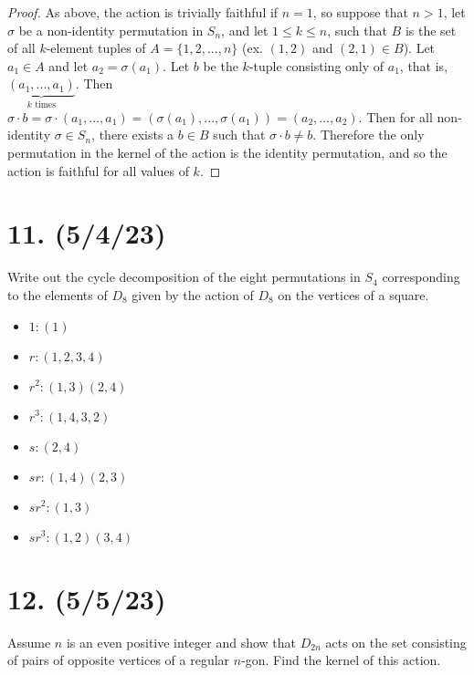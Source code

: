 \documentclass{article}
\begin{document}
\begin{proof}
  As above, the action is trivially faithful if $n = 1$, so suppose that $n > 1$, let $\sigma$ be a non-identity permutation in $S_n$, and let $1 \leq k \leq n$, such that $B$ is the set of all $k$-element tuples of $A = \{ 1, 2, ..., n \}$ (ex. $(1,2)$ and $(2,1) \in B$). Let $a_1 \in A$ and let $a_2 = \sigma(a_1)$. Let $b$ be the $k$-tuple consisting only of $a_1$, that is, $\underbrace{(a_1, ..., a_1)}_{\text{$k$ times}}$. Then $\sigma \cdot b = \sigma \cdot (a_1, ..., a_1) = (\sigma(a_1), ..., \sigma(a_1)) = (a_2, ..., a_2)$. Then for all non-identity $\sigma \in S_n$, there exists a $b \in B$ such that $\sigma \cdot b \neq b$. Therefore the only permutation in the kernel of the action is the identity permutation, and so the action is faithful for all values of $k$.
\end{proof}

\section*{11. (5/4/23)}

Write out the cycle decomposition of the eight permutations in $S_4$ corresponding to the elements of $D_8$ given by the action of $D_8$ on the vertices of a square.

\begin{itemize}
  \item $1: (1)$
  \item $r: (1, 2, 3, 4)$
  \item $r^2: (1, 3)(2, 4)$
  \item $r^3: (1, 4, 3, 2)$
  \item $s: (2, 4)$
  \item $sr: (1, 4)(2, 3)$
  \item $sr^2: (1, 3)$
  \item $sr^3: (1, 2)(3, 4)$
\end{itemize}

\section*{12. (5/5/23)}

Assume $n$ is an even positive integer and show that $D_{2n}$ acts on the set consisting of pairs of opposite vertices of a regular $n$-gon. Find the kernel of this action.
\end{document}

